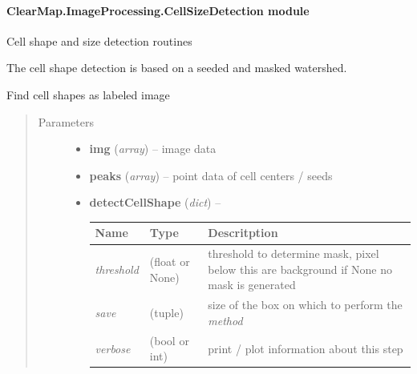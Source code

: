 \documentclass[letterpaper,10pt,english]{sphinxmanual}
\begin{document}
\paragraph{ClearMap.ImageProcessing.CellSizeDetection module}
\label{api/ClearMap.ImageProcessing:module-ClearMap.ImageProcessing.CellSizeDetection}\label{api/ClearMap.ImageProcessing:clearmap-imageprocessing-cellsizedetection-module}
Cell shape and size detection routines

The cell shape detection is based on a seeded and masked watershed.

\begin{fulllineitems}
\label{api/ClearMap.ImageProcessing:ClearMap.ImageProcessing.CellSizeDetection.detectCellShape}
Find cell shapes as labeled image
\begin{quote}\begin{description}
\item[{Parameters}] \leavevmode\begin{itemize}
\item {} 
\textbf{img} (\emph{array}) --
image data

\item {} 
\textbf{peaks} (\emph{array}) --
point data of cell centers / seeds

\item {} 
\textbf{detectCellShape} (\emph{dict}) --

\begin{tabulary}{\linewidth}{|L|L|L|}
\hline
\textsf{\relax 
Name
} & \textsf{\relax 
Type
} & \textsf{\relax 
Descritption
}\\
\hline
\emph{threshold}
 & 
(float or None)
 & 
threshold to determine mask, pixel below this are background
if None no mask is generated
\\
\hline
\emph{save}
 & 
(tuple)
 & 
size of the box on which to perform the \emph{method}
\\
\hline
\emph{verbose}
 & 
(bool or int)
 & 
print / plot information about this step
\\
\hline\end{tabulary}



\end{itemize}
\end{description}
\end{quote}
\end{fulllineitems}
\end{document}
